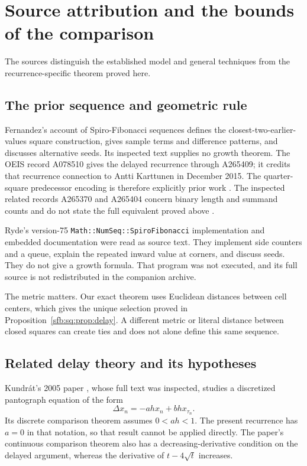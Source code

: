 \documentclass[11pt]{article}
\theoremstyle{remark}\newtheorem{remark}[theorem]{Remark}
\begin{document}
\section{Source attribution and the bounds of the comparison}\label{sfb:sq:sec:sources}
The sources distinguish the established model and general techniques from the recurrence-specific theorem proved here.

\subsection{The prior sequence and geometric rule}
Fernandez's account of Spiro-Fibonacci sequences \cite{fernandez} defines the closest-two-earlier-values square construction, gives sample terms and difference patterns, and discusses alternative seeds. Its inspected text supplies no growth theorem. The OEIS record A078510 \cite{oeis510} gives the delayed recurrence through A265409; it credits that recurrence connection to Antti Karttunen in December 2015. The quarter-square predecessor encoding is therefore explicitly prior work \cite{oeis409}. The inspected related records A265370 and A265404 concern binary length and summand counts and do not state the full equivalent proved above \cite{oeis370,oeis404}.

Ryde's version-75 \texttt{Math::NumSeq::SpiroFibonacci} implementation and embedded documentation \cite{ryde} were read as source text. They implement side counters and a queue, explain the repeated inward value at corners, and discuss seeds. They do not give a growth formula. That program was not executed, and its full source is not redistributed in the companion archive.

The metric matters. Our exact theorem uses Euclidean distances between cell centers, which gives the unique selection proved in Proposition~\ref{sfb:sq:prop:delay}. A different metric or literal distance between closed squares can create ties and does not alone define this same sequence.

\subsection{Related delay theory and its hypotheses}
Kundr\'at's 2005 paper \cite{kundrat05}, whose full text was inspected, studies a discretized pantograph equation of the form
\[
 \Delta x_n=-ahx_n+bhx_{\tau_n}.
\]
Its discrete comparison theorem assumes $0<ah<1$. The present recurrence has $a=0$ in that notation, so that result cannot be applied directly. The paper's continuous comparison theorem also has a decreasing-derivative condition on the delayed argument, whereas the derivative of $t-4\sqrt t$ increases.
\end{document}
